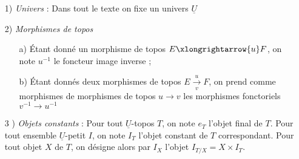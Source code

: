 







\begin{enumerate}
    \item[1)] \emph{Univers} : Dans tout le texte on fixe un univers $\underline{U}$
    \item[2)] \emph{Morphismes de topos}
    \begin{enumerate}
        \item[a)] Étant donné un morphisme de topos $E \xlongrightarrow{u} F$, on note $u^{-1}$ le foncteur image inverse ;
        \item[b)] Étant donnés deux morphismes de topos $E \xrightarrow[v]{u} F$, on prend comme morphismes de morphismes de topos $u \to v$ les morphismes fonctoriels $v^{-1} \to u^{-1}$
    \end{enumerate}
    \item[3 )] \emph{Objets constants} : Pour tout $\underline{U}$-topos $T$, on note $e_T$ l'objet final de $T$. Pour tout ensemble $\underline{U}$-petit $I$, on note $I_T$ l'objet constant de $T$ correspondant. Pour tout objet $X$ de $T$, on désigne alors par $I_X$ l'objet $I_{T/X} = X \times I_T$.
\end{enumerate}







